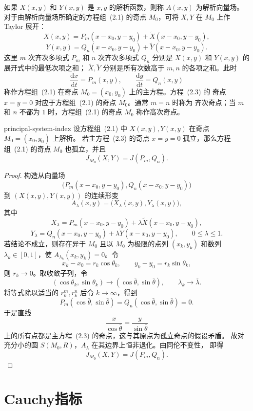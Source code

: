 如果 $X(x,y)$ 和 $Y(x,y)$ 是 $x,y$ 的解析函数，则称
$A(x,y)$ 为解析向量场。对于由解析向量场所确定的方程组~(2.1) 的奇点
$M_0$，可将 $X,Y$ 在 $M_0$ 上作 Taylor 展开：
\[
  X(x,y)=P_m(x-x_0,y-y_0)+\widetilde X(x-x_0,y-y_0),
\]
\[
  Y(x,y)=Q_n(x-x_0,y-y_0)+\widetilde Y(x-x_0,y-y_0).
\]
这里 $m$ 次齐次多项式 $P_m$ 和 $n$ 次齐次多项式 $Q_n$ 分别是
$X(x,y)$ 和 $Y(x,y)$ 的展开式中的最低次项之和；
$\widetilde X,\widetilde Y$ 分别是所有次数高于 $m,n$ 的各项之和。此时
\[
  \dfrac{\mathrm{d}x}{\mathrm{d}t}=P_m(x,y),\qquad
  \dfrac{\mathrm{d}y}{\mathrm{d}t}=Q_n(x,y) \tag{2.3}
\]
称作方程组~(2.1) 在奇点 $M_0=(x_0,y_0)$ 上的主方程。方程~(2.3) 的
奇点 $x=y=0$ 对应于方程组~(2.1) 的奇点 $M_0$。通常 $m=n$ 时称为
齐次奇点；当 $m$ 和 $n$ 不都为 $1$ 时，方程组~(2.1) 的奇点 $M_0$
称作高次奇点。

\begin{theorem}{}{principal-system-index}
设方程组~(2.1) 中 $X(x,y),Y(x,y)$ 在奇点 $M_0=(x_0,y_0)$ 上解析。
若主方程~(2.3) 的奇点 $x=y=0$ 孤立，那么方程组~(2.1) 的奇点 $M_0$
也孤立，并且
\[
  J_{M_0}(X,Y)=J(P_m,Q_n).
\]
\end{theorem}

\begin{proof}
构造从向量场
\[
  \bigl(P_m(x-x_0,y-y_0),Q_n(x-x_0,y-y_0)\bigr)
\]
到 $(X(x,y),Y(x,y))$ 的连续形变
\[
  A_\lambda(x,y)=\bigl(X_\lambda(x,y),Y_\lambda(x,y)\bigr),
\]
其中
\[
  X_\lambda=P_m(x-x_0,y-y_0)+\lambda\widetilde X(x-x_0,y-y_0),
\]
\[
  Y_\lambda=Q_n(x-x_0,y-y_0)+\lambda\widetilde Y(x-x_0,y-y_0),
  \qquad 0\leq\lambda\leq1.
\]
若结论不成立，则存在异于 $M_0$ 且以 $M_0$ 为极限的点列
$(x_k,y_k)$ 和数列 $\lambda_k\in[0,1]$，使
$A_{\lambda_k}(x_k,y_k)=0$。令
\[
  x_k-x_0=r_k\cos\theta_k,\qquad
  y_k-y_0=r_k\sin\theta_k,
\]
则 $r_k\to0$。取收敛子列，令
\[
  (\cos\theta_k,\sin\theta_k)\to
  (\cos\bar\theta,\sin\bar\theta),\qquad
  \lambda_k\to\bar\lambda.
\]
将等式除以适当的 $r_k^m,r_k^n$ 后令 $k\to\infty$，得到
\[
  P_m(\cos\bar\theta,\sin\bar\theta)
  =Q_n(\cos\bar\theta,\sin\bar\theta)=0.
\]
于是直线
\[
  \dfrac{x}{\cos\bar\theta}=\dfrac{y}{\sin\bar\theta}
\]
上的所有点都是主方程~(2.3) 的奇点，这与其原点为孤立奇点的假设矛盾。
故对充分小的圆 $S(M_0,R)$，$A_\lambda$ 在其边界上恒非退化。由同伦不变性，
即得
\[
  J_{M_0}(X,Y)=J(P_m,Q_n).
\]
\end{proof}

\section{Cauchy指标}

